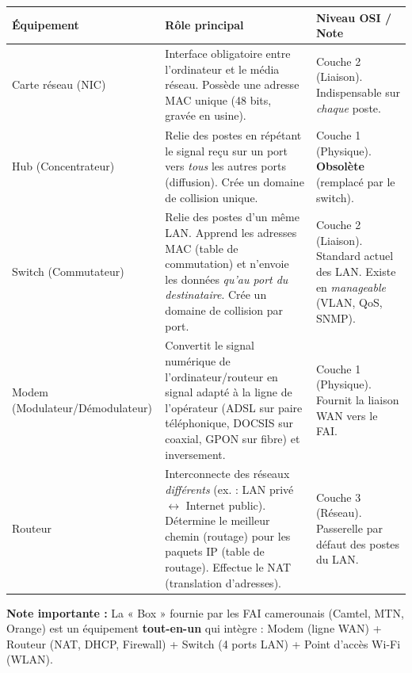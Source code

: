 \documentclass[11pt]{article}
\newcommand{\cle}[1]{{\popxbold\color{popdark}#1}}
\begin{document}
\begin{propriete}
\begin{center}
\begin{tabularx}{\linewidth}{|l|X|X|}
\hline
\rowcolor{popblueL} \textbf{Équipement} & \textbf{Rôle principal} & \textbf{Niveau OSI / Note} \\
\hline
\cle{Carte réseau} (NIC) & Interface obligatoire entre l'ordinateur et le média réseau. Possède une adresse MAC unique (48 bits, gravée en usine). & Couche 2 (Liaison). Indispensable sur \emph{chaque} poste. \\
\hline
\cle{Hub} (Concentrateur) & Relie des postes en répétant le signal reçu sur un port vers \emph{tous} les autres ports (diffusion). Crée un domaine de collision unique. & Couche 1 (Physique). \textbf{Obsolète} (remplacé par le switch). \\
\hline
\cle{Switch} (Commutateur) & Relie des postes d'un même LAN. Apprend les adresses MAC (table de commutation) et n'envoie les données \emph{qu'au port du destinataire}. Crée un domaine de collision par port. & Couche 2 (Liaison). Standard actuel des LAN. Existe en \emph{manageable} (VLAN, QoS, SNMP). \\
\hline
\cle{Modem} (Modulateur/Démodulateur) & Convertit le signal numérique de l'ordinateur/routeur en signal adapté à la ligne de l'opérateur (ADSL sur paire téléphonique, DOCSIS sur coaxial, GPON sur fibre) et inversement. & Couche 1 (Physique). Fournit la liaison WAN vers le FAI. \\
\hline
\cle{Routeur} & Interconnecte des réseaux \emph{différents} (ex. : LAN privé $\leftrightarrow$ Internet public). Détermine le meilleur chemin (routage) pour les paquets IP (table de routage). Effectue le NAT (translation d'adresses). & Couche 3 (Réseau). Passerelle par défaut des postes du LAN. \\
\hline
\end{tabularx}
\end{center}
\textbf{Note importante :} La « Box » fournie par les FAI camerounais (Camtel, MTN, Orange) est un équipement \textbf{tout-en-un} qui intègre : Modem (ligne WAN) + Routeur (NAT, DHCP, Firewall) + Switch (4 ports LAN) + Point d'accès Wi-Fi (WLAN).
\end{propriete}
\end{document}

